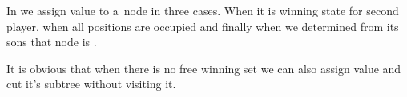 In  we assign value  to a~node in three cases. When it
is winning state for second player, when  all positions are occupied and finally
when we determined from its sons that node is .

It is obvious that when there is no free winning set we can also assign
value  and cut it's subtree without visiting it.

%

